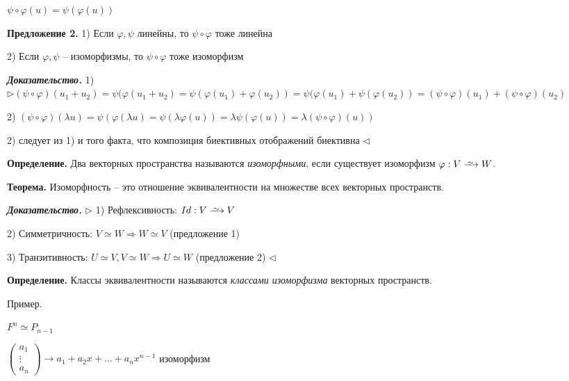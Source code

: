 $\psi \circ \varphi(u)= \psi (\varphi (u))$ 

\vspace{\baselineskip}
\textbf{Предложение 2.} 1) Если $\varphi, \psi$ линейны, то $\psi \circ \varphi$ тоже линейна

2) Если $\varphi, \psi$ -- изоморфизмы, то $\psi \circ \varphi$ тоже изоморфизм

\vspace{\baselineskip}
\textbf{\textit{Доказательство.}} 1) $\rhd (\psi \circ \varphi) (u_1 + u_2) = \psi (\varphi(u_1 + u_2) = \psi(\varphi(u_1) + \varphi(u_2)) = \psi(\varphi(u_1) + \psi (\varphi(u_2)) = (\psi \circ \varphi) (u_1) + (\psi \circ \varphi) (u_2)$ 

2) $(\psi \circ \varphi) (\lambda u) = \psi (\varphi (\lambda u) = \psi (\lambda \varphi (u)) = \lambda \psi (\varphi(u)) = \lambda (\psi \circ \varphi) (u))$

\vspace{\baselineskip}
2) следует из 1) и того факта, что композиция биективных отображений биективна $\lhd$

\vspace{\baselineskip}
\textbf{Определение.} Два векторных пространства называются \textit{изоморфными}, если существует изоморфизм $\varphi : V \iso W$. 

\vspace{\baselineskip}
\textbf{Теорема.} Изоморфность -- это отношение эквивалентности на множестве всех векторных пространств.

\vspace{\baselineskip}
\textbf{\textit{Доказательство.}} $\rhd$ 1) Рефлексивность: $Id: V \iso V$

2) Симметричность: $V \simeq W \Rightarrow W \simeq V$ (предложение 1)

3) Транзитивность: $U \simeq V, V \simeq W \Rightarrow U \simeq W$ (предложение 2) $\lhd$

\vspace{\baselineskip}
\textbf{Определение.} Классы эквивалентности называются \textit{классами изоморфизма} векторных пространств.

\vspace{\baselineskip}
Пример. 

$F^n \simeq P_{n-1}$

$\begin{pmatrix} a_1 \\ \vdots \\ a_n \end{pmatrix} \rightarrow a_1 + a_2 x + \dots + a_n x^{n-1}$ изоморфизм

\vspace{\baselineskip}
